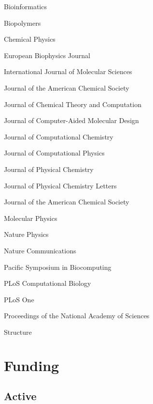 \documentclass[10pt]{article}
\begin{document}
Bioinformatics

Biopolymers

Chemical Physics

European Biophysics Journal

International Journal of Molecular Sciences

Journal of the American Chemical Society

Journal of Chemical Theory and Computation

Journal of Computer-Aided Molecular Design

Journal of Computational Chemistry

Journal of Computational Physics

Journal of Physical Chemistry

Journal of Physical Chemistry Letters

Journal of the American Chemical Society

Molecular Physics

Nature Physics

Nature Communications

Pacific Symposium in Biocomputing

PLoS Computational Biology

PLoS One

Proceedings of the National Academy of Sciences

Structure

\vfill{}
\hrulefill


\eject


\section*{Funding}

\subsection*{Active}
\end{document}
